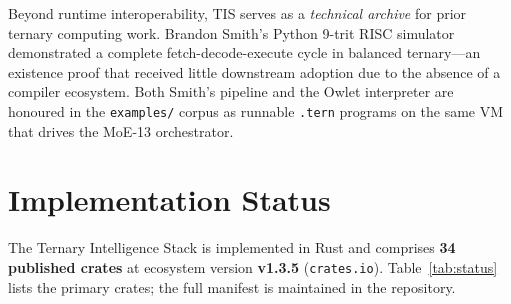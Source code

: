 \documentclass[journal,10pt,twocolumn]{IEEEtran}
\begin{document}
Beyond runtime interoperability, TIS serves as a \emph{technical archive}
for prior ternary computing work. Brandon Smith's Python 9-trit RISC
simulator demonstrated a complete fetch-decode-execute cycle in balanced
ternary---an existence proof that received little downstream adoption due to
the absence of a compiler ecosystem. Both Smith's pipeline and the Owlet
interpreter are honoured in the \texttt{examples/} corpus as runnable
\texttt{.tern} programs on the same VM that drives the MoE-13 orchestrator.

\section{Implementation Status}
\label{sec:status}

The Ternary Intelligence Stack is implemented in Rust and comprises
\textbf{34 published crates} at ecosystem version \textbf{v1.3.5}
(\texttt{crates.io}). Table~\ref{tab:status} lists the primary crates;
the full manifest is maintained in the repository.
\end{document}
